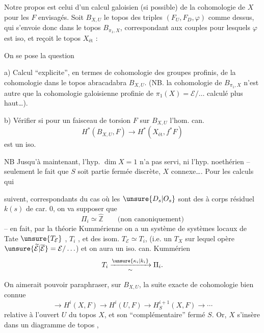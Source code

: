 Notre propos est celui d'un calcul galoisien
(si possible) de la cohomologie de $X$ pour
les $F$ envisagés.
Soit $B_{X,U}$ le topos  des triples
$(F_U,F_D,\varphi)$ comme dessus, qui s'envoie
donc dans le topos $B_{\pi_1,X}$, correspondant
aux couples pour lesquels $\varphi$ est iso,
et reçoit le topos $X_{\mathrm{ét}}$ :

On se pose la question

a) Calcul ``explicite'', en termes de cohomologie
des groupes profinis, de la cohomologie
dans le topos abracadabra $B_{X,U}$. (NB.
 la cohomologie  de
$B_{\pi_1,X}$ n'est autre que la cohomologie
galoisienne profinie de $\pi_1(X)=\mathcal E/\ldots$
calculé plus haut\ldots).

b) Vérifier si pour un faisceau de
torsion $F$ sur $B_{X,U}$ l'hom. can.
\[
H^{*}(B_{X,U},F)\longrightarrow
H^{*}(X_{\mathrm{ét}},f^{*}F)
\]
est un iso.

NB Jusqu'à maintenant, l'hyp.
$\dim X=1$ n'a pas servi, ni l'hyp. noethérien
-- seulement le fait que $S$ soit partie fermée
discrète, $X$ connexe\ldots. Pour les calculs qui

suivent, correspondants du  cas où les
$\unsure{D_s|O_s}$ sont des  à corps résiduel $k(s)$
de car. $0$, on va supposer que
\[
\Pi_i\simeq\widehat{\mathbb Z}\qquad\text{(non canoniquement)}
\]
-- en fait, par la théorie Kummérienne on
a un système de systèmes locaux de Tate
$\unsure{T_{\mathcal E}}$ , $T_i$ , et des isom. $T_{\mathcal E}\simeq T_i$, 
(i.e. un $T_X$ sur lequel opère $\unsure{\widetilde{\mathcal E}|\overline{\mathcal E}}=\mathcal E/\ldots$)
et on aura un iso. can. Kummérien
\[
T_i\xrightarrow[\sim]{\unsure{\kappa_i|k_i}}\Pi_i.
\]

On aimerait pouvoir paraphraser,
sur $B_{X,U}$, la suite exacte de cohomologie
bien connue
\[
\longrightarrow H^i(X,F)\longrightarrow H^i(U,F)
\longrightarrow H^{i+1}_S(X,F)\longrightarrow\cdots
\]
relative à l'ouvert $U$ du topos $X$, et son
``complémentaire'' fermé $S$. Or,  
$X$ s'insère dans un diagramme de topos
,


